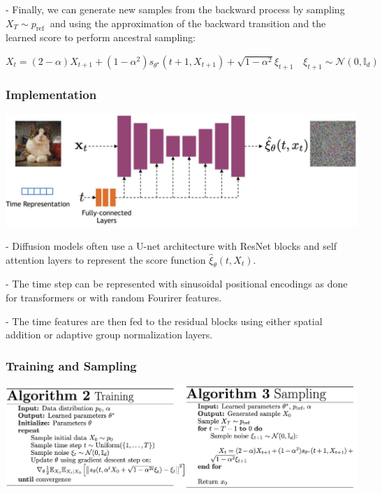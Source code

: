 - Finally, we can generate new samples from the backward process by sampling $X_{T} \sim p_{\text {ref }}$ and using the approximation of the backward transition and the learned score to perform ancestral sampling:

$
X_{t}=(2-\alpha) X_{t+1}+(1-\alpha^{2}) s_{\theta^{\star}}(t+1, X_{t+1})+\sqrt{1-\alpha^{2}} \xi_{t+1} \quad \xi_{t+1} \sim \mathcal{N}(0, \mathbb{I}_{d})
$

\subsubsection*{Implementation}

\includegraphics*[width=\columnwidth]{figures/generative_diffusion_architecture.jpg}

- Diffusion models often use a U-net architecture with ResNet blocks and self attention layers to represent the score function $\hat{\xi}_{\theta}(t, X_{t})$.

- The time step can be represented with sinusoidal positional encodings as done for transformers or with random Fourirer features. 

- The time features are then fed to the residual blocks using either spatial addition or adaptive group normalization layers.

\subsubsection*{Training and Sampling}

\includegraphics*[width=\columnwidth]{figures/generative_diffusion_training_sampling.png}


